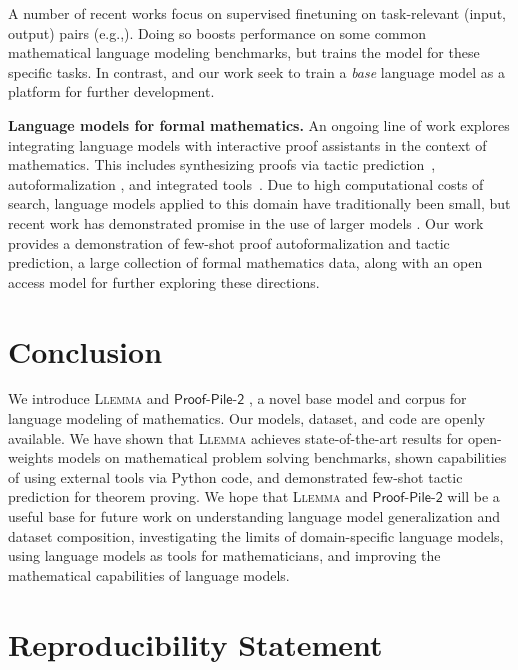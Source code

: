 A number of recent works focus on supervised finetuning on task-relevant (input, output) pairs (e.g.,\citet{yu2023metamath, yue2023mammoth}). Doing so boosts performance on some common mathematical language modeling benchmarks, but trains the model for these specific tasks. In contrast, \citet{lewkowycz2022solving} and our work seek to train a \textit{base} language model as a platform for further development. 

\textbf{Language models for formal mathematics.} An ongoing line of work explores integrating language models with interactive proof assistants in the context of mathematics. This includes synthesizing proofs via tactic prediction~\citep{polu2020generative, han2022proof, lample2022hypertree, jiang2022thor}, autoformalization \citep{wu2022autoformalization,jiang2023draft}, and integrated tools~\citep{llmstep}. Due to high computational costs of search, language models applied to this domain have traditionally been small, but recent work has demonstrated promise in the use of larger models \citep{first2023baldur, jiang2023draft}. Our work provides a demonstration of few-shot proof autoformalization and tactic prediction, a large collection of formal mathematics data, along with an open access model for further exploring these directions.

\section{Conclusion}

We introduce \textsc{Llemma} and $\mathsf{Proof}$-$\mathsf{Pile}$-$\mathsf{2}$ , a novel base model and corpus for language modeling of mathematics. Our models, dataset, and code are openly available. We have shown that \textsc{Llemma} achieves state-of-the-art results for open-weights models on mathematical problem solving benchmarks, shown capabilities of using external tools via Python code, and demonstrated few-shot tactic prediction for theorem proving. We hope that \textsc{Llemma} and $\mathsf{Proof}$-$\mathsf{Pile}$-$\mathsf{2}$ will be a useful base for future work on understanding language model generalization and dataset composition, investigating the limits of domain-specific language models, using language models as tools for mathematicians, and improving the mathematical capabilities of language models.

\iffalse
\section*{Reproducibility Statement}

